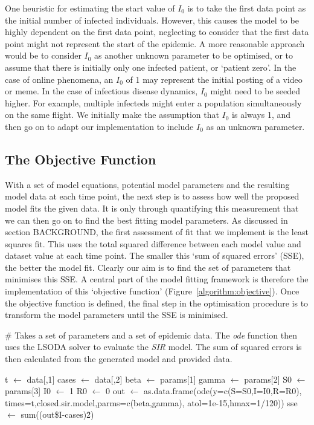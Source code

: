 One heuristic for estimating the start value of $I_0$ is to take the
first data point as the initial number of infected
individuals. However, this causes the model to be highly dependent on
the first data point, neglecting to consider that the first data point
might not represent the start of the epidemic. A more reasonable
approach would be to consider $I_0$ as another unknown parameter to be
optimised, or to assume that there is initially only one infected
patient, or `patient zero'. In the case of online phenomena, an $I_0$
of 1 may represent the initial posting of a video or meme. In the case
of infectious disease dynamics, $I_0$ might need to be seeded
higher. For example, multiple infecteds might enter a population
simultaneously on the same flight. We initially make the assumption
that $I_0$ is always 1, and then go on to adapt our
implementation to include $I_0$ as an unknown parameter.


\subsection{The Objective Function}
With a set of model equations, potential model parameters and the
resulting model data at each time point, the next step is to assess
how well the proposed model fits the given data. It is only through
quantifying this measurement that we can then go on to find the best
fitting model parameters. As discussed in section BACKGROUND, the
first assessment of fit that we implement is the least squares
fit. This uses the total squared difference between each model
value and dataset value at each time point. The smaller this `sum of
squared errors' (SSE), the better the model fit. Clearly our aim is to find
the set of parameters that minimises this SSE. A central part of the
model fitting framework is therefore the implementation of this
`objective function' (Figure~\ref{algorithm:objective}). Once the objective function is
defined, the final step in the optimisation procedure is to transform
the model parameters until the SSE is minimised.

\begin{algorithm}
\begin{algorithmic}
  
  \State \# Takes a set of parameters and a set of
  epidemic data. The \emph{ode} function then uses the LSODA solver to
  evaluate the \emph{SIR} model. The sum of squared
  errors is then calculated from the generated model and provided data.
  \State

  \State t $\gets$ data[,1]
  \State cases $\gets$ data[,2]
  \State
  \State beta $\gets$ params[1]
  \State gamma $\gets$ params[2]
  \State
  \State S0 $\gets$ params[3]
  \State I0 $\gets$ 1
  \State R0 $\gets$ 0
  \State
  \State out $\gets$ as.data.frame(ode(y=c(S=S0,I=I0,R=R0),
  times=t,closed.sir.model,parms=c(beta,gamma),
  atol=1e-15,hmax=1/120))
  \State sse $\gets$ sum((out\$I-cases)\^2)
  \EndFunction
 \end{algorithmic}
\label{algorithm:objective}
\end{algorithm}


